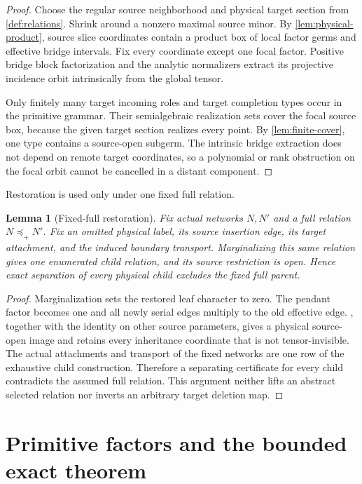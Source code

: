 \documentclass[11pt]{article}
\newtheorem{lemma}[theorem]{Lemma}
\theoremstyle{remark}
\newcommand{\preceqplus}{\preceq_+}
\newcommand{\1}{\mathbf 1}
\begin{document}
\begin{proof}
Choose the regular source neighborhood and physical target section from
\cref{def:relations}.  Shrink around a nonzero maximal source minor.  By
\cref{lem:physical-product}, source slice coordinates contain a product box
of local factor germs and effective bridge intervals.  Fix every coordinate
except one focal factor.  Positive bridge block factorization and the analytic
normalizers extract its projective incidence orbit intrinsically from the
global tensor.

Only finitely many target incoming roles and target completion types occur in
the primitive grammar.  Their semialgebraic realization sets cover the focal
source box, because the given target section realizes every point.  By
\cref{lem:finite-cover}, one type contains a source-open subgerm.  The
intrinsic bridge extraction does not depend on remote target coordinates, so
a polynomial or rank obstruction on the focal orbit cannot be cancelled in a
distant component.
\end{proof}

Restoration is used only under one fixed full relation.

\begin{lemma}[Fixed-full restoration]\label{lem:restoration}
Fix actual networks \(N,N'\) and a full relation \(N\preceqplus N'\).  Fix an
omitted physical label, its source insertion edge, its target attachment, and
the induced boundary transport.  Marginalizing this same relation gives one
enumerated child relation, and its source restriction is open.  Hence exact
separation of every physical child excludes the fixed full parent.
\end{lemma}

\begin{proof}
Marginalization sets the restored leaf character to zero.  The pendant factor
becomes one and all newly serial edges multiply to the old effective edge.
, together with the identity on other source
parameters, gives a physical source-open image and retains every inheritance
coordinate that is not tensor-invisible.  The actual attachments and
transport of the fixed networks are one row of the exhaustive child
construction.
Therefore a separating certificate for every child contradicts the assumed
full relation.  This argument neither lifts an abstract selected relation nor
inverts an arbitrary target deletion map.
\end{proof}

\section{Primitive factors and the bounded exact theorem}\label{sec:finite}
\end{document}
